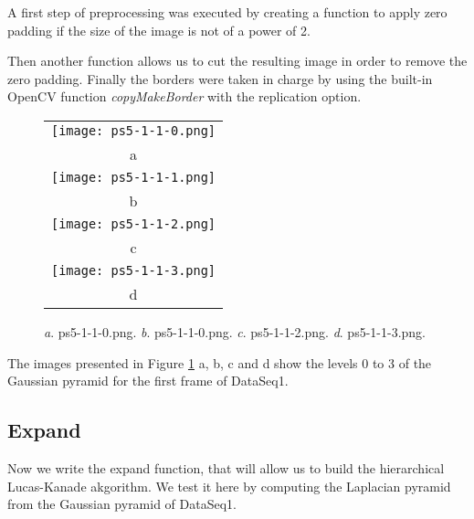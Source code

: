 \documentclass[a4paper,11pt]{article}
\begin{document}
A first step of preprocessing was executed by creating a function to apply zero padding if the size of the image is not of a power of 2.
 
Then another function allows us to cut the resulting image in order to remove the zero padding. Finally the borders were taken in charge by using the built-in OpenCV function \textit{copyMakeBorder} with the replication option.

\lstset{style=mystyle}


\lstset{style=mystyle}



 \begin{figure}[H]
\begin{center}
\begin{tabular}{c}
	\texttt{[image: ps5-1-1-0.png]}\\
	a\\
	\texttt{[image: ps5-1-1-1.png]}\\
	b\\
	\texttt{[image: ps5-1-1-2.png]}\\
	c\\
	\texttt{[image: ps5-1-1-3.png]}\\
	d
\end{tabular}
\end{center}
\caption{ 
\textit{a}. ps5-1-1-0.png.  \textit{b}. ps5-1-1-0.png. \textit{c}. ps5-1-1-2.png.  \textit{d}. ps5-1-1-3.png.  }
\label{ps-5-1}
\end{figure}

The images presented in Figure \ref{ps-5-1} a, b, c and d show the levels 0 to 3 of the Gaussian pyramid for the first frame of DataSeq1.



\subsection{Expand}

Now we write the expand function, that will allow us to build the hierarchical Lucas-Kanade akgorithm.
We test it here by computing the Laplacian pyramid from the Gaussian pyramid of DataSeq1.

\lstset{style=mystyle}

\end{document}
